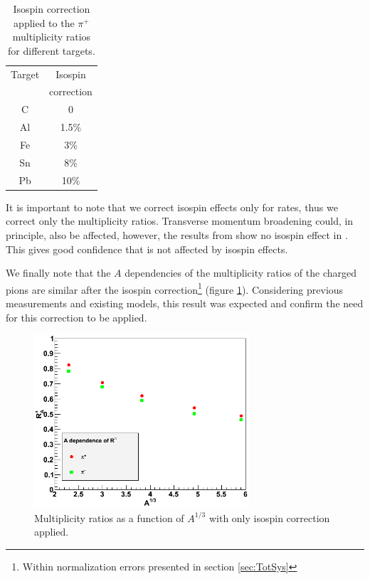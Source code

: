 \begin{table}[htbp]
  \centering
  \begin{tabular}{@{} cc @{}}
    \hline
    Target & Isospin  \\ 
           & correction \\ 
    \hline
    C & 0 \\
    Al & 1.5\%\\
    Fe &  3\% \\
    Sn &  8\%\\
    Pb &  10\% \\
    \hline
  \end{tabular}
  \caption{Isospin correction applied to the $\pi^+$ multiplicity ratios for different targets.}
  \label{tab:isospin}
\end{table}

It is important to note that we correct isospin effects only for rates, thus 
we correct only the multiplicity ratios. Transverse momentum broadening could, in 
principle, also be affected, however, the results from \cite{Asaturyan:2011mq} 
show no isospin effect in \ptp. This gives good confidence that \dpt is not 
affected by isospin effects.

We finally note that the $A$ dependencies of the multiplicity ratios of the 
charged pions are similar after the isospin correction\footnote{Within 
normalization errors presented in section \ref{sec:TotSys}} (figure 
\ref{fig:IsoPlot}). Considering previous measurements and existing models, 
this result was expected and confirm the need for this correction to be applied.

\begin{figure}[tbp]
\centering
\includegraphics[width=8cm] {chap5-fig/c_RvA.png}
\caption {Multiplicity ratios as a function of $A^{1/3}$ 
with only isospin correction applied.}
\label{fig:IsoPlot}
\end{figure}

